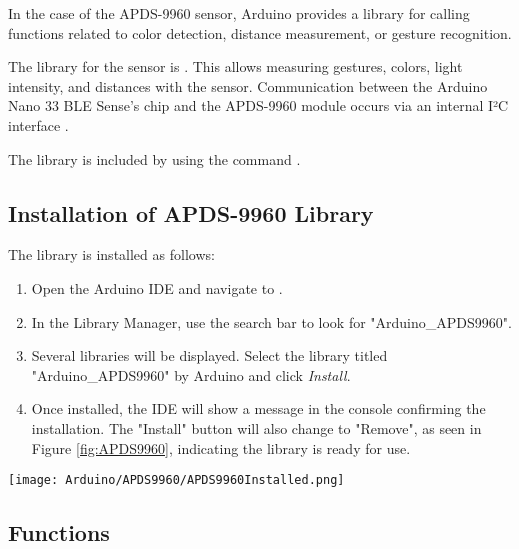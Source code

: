 In the case of the APDS-9960 sensor, Arduino provides a library  for calling functions related to color detection, distance measurement, or gesture recognition.

The library for the sensor is . This allows measuring gestures, colors, light intensity, and distances with the sensor. Communication between the Arduino Nano 33 BLE Sense's chip and the APDS-9960 module occurs via an internal I²C interface \cite{Avago:2015}.

The library is included by using the command .






\subsection{Installation of APDS-9960 Library}

The library is installed as follows:



\begin{enumerate}
	\item Open the Arduino IDE and navigate to .
	\item In the Library Manager, use the search bar to look for "Arduino\_APDS9960".
	\item Several libraries will be displayed. Select the library titled "Arduino\_APDS9960" by Arduino and click \textit{Install}.
	\item Once installed, the IDE will show a message in the console confirming the installation. The "Install" button will also change to "Remove", as seen in Figure \ref{fig:APDS9960}, indicating the library is ready for use.
\end{enumerate}


\begin{center}
	\texttt{[image: Arduino/APDS9960/APDS9960Installed.png]}
	\label{fig:APDS9960}		
\end{center} 










\subsection{Functions}

